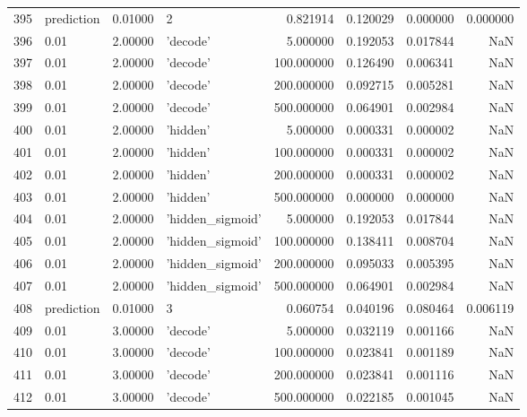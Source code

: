 \documentclass[10pt,a4paper]{article}
\begin{document}
\begin{tabular}{llrlrrrr}
395  &  prediction &   0.01000 &                  2 &    0.821914 &  0.120029 &  0.000000 &  0.000000 \\
396  &        0.01 &   2.00000 &           'decode' &    5.000000 &  0.192053 &  0.017844 &       NaN \\
397  &        0.01 &   2.00000 &           'decode' &  100.000000 &  0.126490 &  0.006341 &       NaN \\
398  &        0.01 &   2.00000 &           'decode' &  200.000000 &  0.092715 &  0.005281 &       NaN \\
399  &        0.01 &   2.00000 &           'decode' &  500.000000 &  0.064901 &  0.002984 &       NaN \\
400  &        0.01 &   2.00000 &           'hidden' &    5.000000 &  0.000331 &  0.000002 &       NaN \\
401  &        0.01 &   2.00000 &           'hidden' &  100.000000 &  0.000331 &  0.000002 &       NaN \\
402  &        0.01 &   2.00000 &           'hidden' &  200.000000 &  0.000331 &  0.000002 &       NaN \\
403  &        0.01 &   2.00000 &           'hidden' &  500.000000 &  0.000000 &  0.000000 &       NaN \\
404  &        0.01 &   2.00000 &   'hidden\_sigmoid' &    5.000000 &  0.192053 &  0.017844 &       NaN \\
405  &        0.01 &   2.00000 &   'hidden\_sigmoid' &  100.000000 &  0.138411 &  0.008704 &       NaN \\
406  &        0.01 &   2.00000 &   'hidden\_sigmoid' &  200.000000 &  0.095033 &  0.005395 &       NaN \\
407  &        0.01 &   2.00000 &   'hidden\_sigmoid' &  500.000000 &  0.064901 &  0.002984 &       NaN \\
408  &  prediction &   0.01000 &                  3 &    0.060754 &  0.040196 &  0.080464 &  0.006119 \\
409  &        0.01 &   3.00000 &           'decode' &    5.000000 &  0.032119 &  0.001166 &       NaN \\
410  &        0.01 &   3.00000 &           'decode' &  100.000000 &  0.023841 &  0.001189 &       NaN \\
411  &        0.01 &   3.00000 &           'decode' &  200.000000 &  0.023841 &  0.001116 &       NaN \\
412  &        0.01 &   3.00000 &           'decode' &  500.000000 &  0.022185 &  0.001045 &       NaN \\

\end{tabular}
\end{document}
